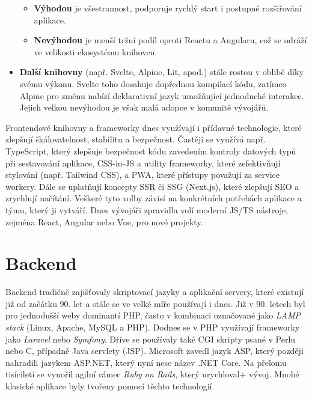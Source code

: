 \begin{itemize}
        \begin{itemize}
            \item \textbf{Výhodou} je všestrannost, podporuje rychlý start
                i postupné rozšiřování aplikace.
                \cite{YHVfLHsNlUItkF6G,1WL9hIh67tHjtVTy}
            \item \textbf{Nevýhodou} je menší tržní podíl oproti Reactu
                a Angularu, což se odráží ve velikosti ekosystému knihoven.
                \cite{YHVfLHsNlUItkF6G,1WL9hIh67tHjtVTy}
        \end{itemize}
    \item \textbf{Další knihovny} (např. Svelte, Alpine, Lit, apod.)
        stále rostou v oblibě díky svému výkonu. Svelte toho dosahuje
        dopřednou kompilací kódu, zatímco Alpine pro změnu nabízí
        deklarativní jazyk umožňující jednoduché interakce. Jejich velkou
        nevýhodou je však malá adopce v komunitě vývojářů.
\end{itemize}

Frontendové knihovny a frameworky dnes využívají i přídavné technologie,
které zlepšují škálovatelnost, stabilitu a bezpečnost. Častěji se využívá
např. TypeScript, který zlepšuje bezpečnost kódu zavedením kontroly
datových typů při sestavování aplikace, CSS-in-JS a utility frameworky,
které zefektivňují stylování (např. Tailwind CSS), a PWA, které přístupy
považují za service workery. Dále se uplatňují koncepty SSR či SSG (Next.js),
které zlepšují SEO a zrychlují načítání. Veškeré tyto volby závisí
na konkrétních potřebách aplikace a týmu, který ji vytváří. Dnes vývojáři
zpravidla volí moderní JS/TS nástroje, zejména React, Angular nebo Vue,
pro nové projekty.

\section{Backend}
\label{sec:research-backend}

Backend tradičně zajišťovaly skriptovací jazyky a aplikační servery,
které existují již od začátku 90. let a stále se ve velké míře používají
i dnes. Již v 90. letech byl pro jednodušší weby dominantí PHP,
často v kombinaci označované jako \emph{LAMP stack} (Linux, Apache, MySQL
a PHP). Dodnes se v PHP využívají frameworky jako \emph{Laravel} nebo
\emph{Symfony}. Dříve se používaly také CGI skripty psané v Perlu nebo C,
případně Java servlety (JSP). Microsoft zavedl jazyk ASP, který později
nahradili jazykem ASP.NET, který nyní nese název .NET Core. Na přelomu
tisíciletí se vynořil agilní rámec \emph{Ruby on Rails}, který urychloval+
vývoj. Mnohé klasické aplikace byly tvořeny pomocí těchto technologií.

